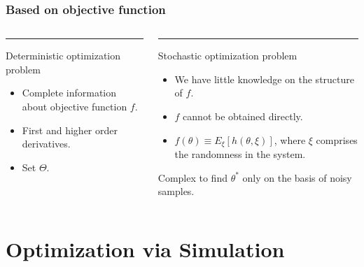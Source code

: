 \begin{frame}
\frametitle{\centering Based on  objective function}
\begin{small}
\begin{columns}[T]
\begin{column}{.48\textwidth}
\color{red}\rule{\linewidth}{4pt}
Deterministic optimization problem
\begin{itemize}
\item Complete information about objective function $f$.
\item First and higher order derivatives.
\item Set $\Theta$.
\end{itemize}
\end{column}
\begin{column}{.48\textwidth}
\color{blue}\rule{\linewidth}{4pt}
Stochastic optimization problem
\begin{itemize}
\item We have little knowledge on the structure of $f$.
\item $f$ cannot be obtained directly.
\item $f(\theta) \equiv E_{\xi}[h(\theta,\xi)]$, where $\xi$ comprises the randomness in the system.
\end{itemize}
Complex  to find $\theta^{*}$ only on the basis of noisy samples.
\end{column}
\end{columns}
\end{small}
\end{frame}


\section{Optimization via Simulation}


